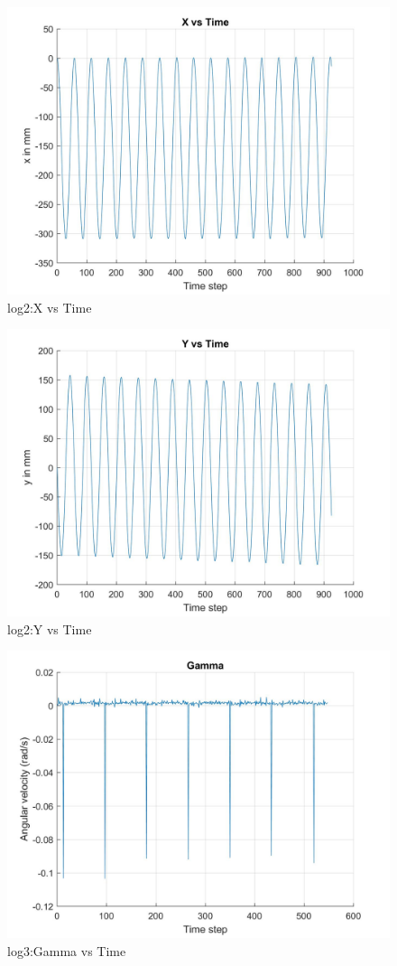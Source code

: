 \documentclass[paper=a4, fontsize=11pt]{scrartcl} %
\numberwithin{equation}{section} %
\numberwithin{figure}{section} %
\numberwithin{table}{section} %
\begin{document}
\begin{appendix}
\begin{figure}[H]
	\centering
	\includegraphics[width = 0.6\linewidth]{./figures/log2/xVsTime.jpg}
	\caption{log2:X vs Time}
\end{figure}

\begin{figure}[H]
	\centering
	\includegraphics[width = 0.6\linewidth]{./figures/log2/yVsTime.jpg}
	\caption{log2:Y vs Time}
\end{figure}

\begin{figure}[H]
	\centering
	\includegraphics[width = 0.6\linewidth]{./figures/log3/gammaVsTime.jpg}
	\caption{log3:Gamma vs Time}
\end{figure}


\end{appendix}
\end{document}
